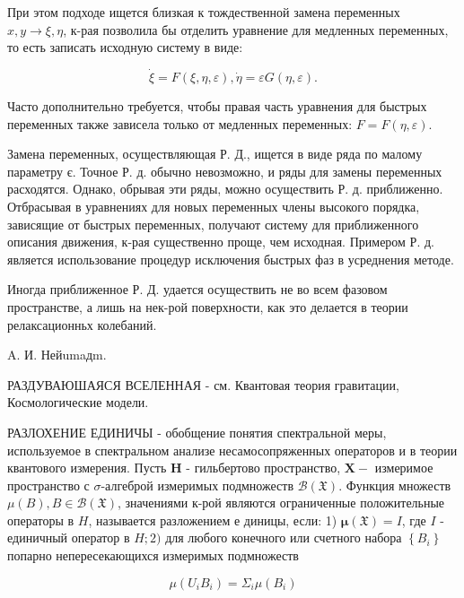 \documentclass[10pt]{article}
\begin{document}
При этом подходе ищется близкая к тождественной замена переменных $x, y \rightarrow \xi, \eta$, к-рая позволила бы отделить уравнение для медленных переменных, то есть записать исходную систему в виде:



\[

\dot{\xi}=F(\xi, \eta, \varepsilon), \dot{\eta}=\varepsilon G(\eta, \varepsilon) .

\]



Часто дополнительно требуется, чтобы правая часть уравнения для быстрых переменных также зависела только от медленных переменных: $F=F(\eta, \varepsilon)$.



Замена переменных, осуществляющая Р. Д., ищется в виде ряда по малому параметру є. Точное Р. д. обычно невозможно, и ряды для замены переменных расходятся. Однако, обрывая эти ряды, можно осуществить Р. д. приближенно. Отбрасывая в уравнениях для новых переменных члены высокого порядка, зависящие от быстрых переменных, получают систему для приближенного описания движения, к-рая существенно проще, чем исходная. Примером Р. д. является использование процедур исключения быстрых фаз в усреднения методе.



Иногда приближенное Р. Д. удается осуществить не во всем фазовом пространстве, а лишь на нек-рой поверхности, как это делается в теории релаксационньх колебаний.



A. И. Нейumaдm.



РАЗДУВАЮШАЯСЯ ВСЕЛЕННАЯ - см. Квантовая теория гравитации, Космологические модели.



РАЗЛОХЕНИЕ ЕДИНИЧЫ - обобщение понятия спектральной меры, используемое в спектральном анализе несамосопряженных операторов и в теории квантового измерения. Пусть $\boldsymbol{H}$ - гильбертово пространство, $\boldsymbol{X}-$ измеримое пространство с $\sigma$-алгеброй измеримых подмножеств $\mathscr{B}(\mathfrak{X})$. Функция множеств $\mathscr{\mu}(B), B \in \mathscr{B}(\mathfrak{X})$, значениями к-рой являются ограниченные положительные операторы в $H$, называется разложением е диницы, если: 1) $\boldsymbol{\mu}(\mathfrak{X})=I$, где $I$ - единичный оператор в $H ; 2)$ для любого конечного или счетного набора $\left\{B_{i}\right\}$ попарно непересекающихся измеримых подмножеств



\[

\mathscr{\mu}\left(U_{i} B_{i}\right)=\Sigma_{i} \mu\left(B_{i}\right)

\]
\end{document}

